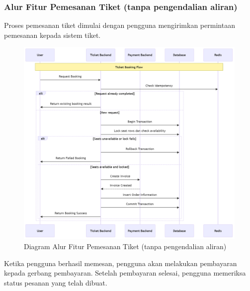 \pagebreak

\subsubsection{Alur Fitur Pemesanan Tiket (tanpa pengendalian aliran)}

Proses pemesanan tiket dimulai dengan pengguna mengirimkan permintaan pemesanan kepada sistem tiket.

\begin{figure}[htbp]
    \centering
    \includegraphics[width=1\textwidth]{resources/chapter-3/book-flow.png}
    \caption{Diagram Alur Fitur Pemesanan Tiket (tanpa pengendalian aliran)}
    \label{fig:flow-book-flow}
\end{figure}

\pagebreak

Ketika pengguna berhasil memesan, pengguna akan melakukan pembayaran kepada gerbang pembayaran. Setelah pembayaran selesai, pengguna memeriksa status pesanan yang telah dibuat.

